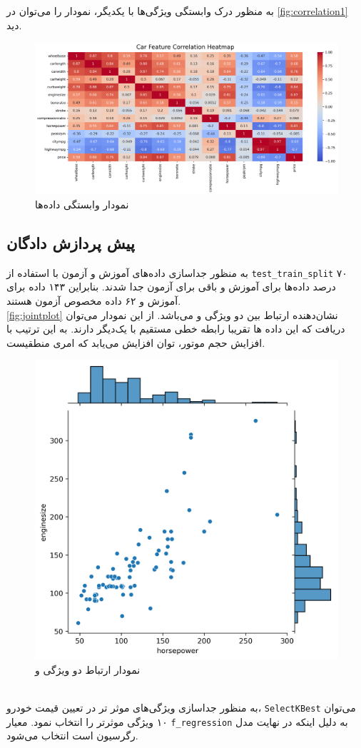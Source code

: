 \documentclass[11pt]{article}
\begin{document}
	به منظور درک وابستگی ویژگی‌ها با یکدیگر، نمودار 
	را می‌توان در 
	\autoref{fig:correlation1}
	دید.
	\begin{figure}[!h]
		\centerline{\includegraphics[width=1\linewidth]{../HW2_1/CorrelationHeatmap.png}}
		\caption{نمودار وابستگی داده‌ها}
		\label{fig:correlation1}
	\end{figure}
	\subsection{پیش پردازش دادگان}
	به منظور جداسازی داده‌های آموزش و آزمون با استفاده از 
	\verb|test_train_split|
	۷۰ درصد داده‌ها برای آموزش و باقی برای آزمون جدا شدند. بنابراین ۱۴۳ داده برای آموزش و ۶۲ داده مخصوص آزمون هستند.\\
	\autoref{fig:jointplot}
	نشان‌دهنده ارتباط بین دو ویژگی  و  می‌باشد. از این نمودار می‌توان دریافت که این داده ‌ها تقریبا رابطه خطی مستقیم با یک‌دیگر دارند. به این ترتیب با افزایش حجم موتور، توان افزایش می‌یابد که امری منطقیست.
	 \begin{figure}[!h]
	 	\centerline{\includegraphics[width=0.6\linewidth]{../HW2_1/Jointplot.png}}
	 	\caption{نمودار ارتباط دو ویژگی  و }
	 	\label{fig:jointplot}
	 \end{figure}\\
	 به منظور جداسازی ویژگی‌های موثر تر در تعیین قیمت خودرو،‌
	 \verb|SelectKBest|
	 می‌توان ۱۰ ویژگی موثرتر را انتخاب نمود. معیار
	 \verb|f_regression|
	 به دلیل اینکه در نهایت مدل رگرسیون است انتخاب می‌شود.
	 
\end{document}
